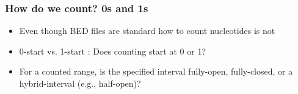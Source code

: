 \documentclass{beamer}
\begin{document}













\begin{frame}
  \frametitle{How do we count? 0s and 1s}
  \begin{itemize}
  \item Even though BED files are standard how to count nucleotides is not
  \item 0-start vs. 1-start : Does counting start at 0 or 1?
  \item For a counted range, is the specified interval fully-open, fully-closed, or a hybrid-interval (e.g., half-open)? 
  \end{itemize}
\end{frame}
\end{document}
